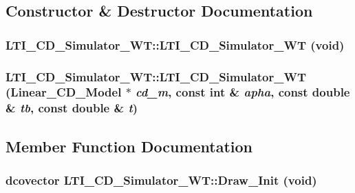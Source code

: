 \subsection{Constructor \& Destructor Documentation}
\hypertarget{class_l_t_i___c_d___simulator___w_t_b19915f3fc8903845fe748efd495fb5a}{
\subsubsection[{LTI\_\-CD\_\-Simulator\_\-WT}]{\setlength{\rightskip}{0pt plus 5cm}LTI\_\-CD\_\-Simulator\_\-WT::LTI\_\-CD\_\-Simulator\_\-WT (void)}}
\label{class_l_t_i___c_d___simulator___w_t_b19915f3fc8903845fe748efd495fb5a}


\hypertarget{class_l_t_i___c_d___simulator___w_t_2d512981a1e18a2fab3e2ad7b5ea9b43}{
\subsubsection[{LTI\_\-CD\_\-Simulator\_\-WT}]{\setlength{\rightskip}{0pt plus 5cm}LTI\_\-CD\_\-Simulator\_\-WT::LTI\_\-CD\_\-Simulator\_\-WT ({\bf Linear\_\-CD\_\-Model} $\ast$ {\em cd\_\-m}, \/  const int \& {\em apha}, \/  const double \& {\em tb}, \/  const double \& {\em t})}}
\label{class_l_t_i___c_d___simulator___w_t_2d512981a1e18a2fab3e2ad7b5ea9b43}




\subsection{Member Function Documentation}
\hypertarget{class_l_t_i___c_d___simulator___w_t_a63eaac608a5f214468dc13d34f8f20f}{
\subsubsection[{Draw\_\-Init}]{\setlength{\rightskip}{0pt plus 5cm}dcovector LTI\_\-CD\_\-Simulator\_\-WT::Draw\_\-Init (void)}}
\label{class_l_t_i___c_d___simulator___w_t_a63eaac608a5f214468dc13d34f8f20f}


